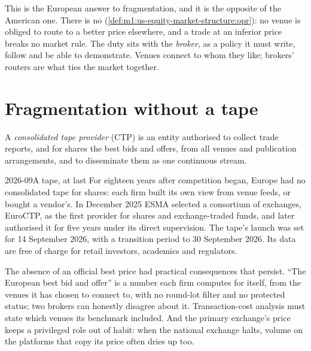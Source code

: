 This is the European answer to fragmentation, and it is the opposite of the
American one. There is no 
(\cref{def:m1:us-equity-market-structure:opr}): no venue is obliged to route
to a better price elsewhere, and a trade at an inferior price breaks no
market rule. The duty sits with the \emph{broker}, as a policy it must write,
follow and be able to demonstrate. Venues connect to whom they like; brokers'
routers are what ties the market together.

\section{Fragmentation without a tape}

\begin{definition}\label{def:m1:european-equity-market-structure:ctp}
A \emph{consolidated tape provider} (CTP)
is an entity authorised to collect trade reports, and for shares the best
bids and offers, from all venues and publication arrangements, and to
disseminate them as one continuous stream.
\end{definition}

\begin{dated}{2026-09}{A tape, at last}\label{dat:m1:european-equity-market-structure:ctp}
For eighteen years after competition began, Europe had no consolidated tape
for shares: each firm built its own view from venue feeds, or bought a
vendor's. In December 2025 ESMA selected a consortium of exchanges, EuroCTP,
as the first provider for shares and exchange-traded funds, and later
authorised it for five years under its direct supervision. The tape's launch
was set for 14 September 2026, with a transition period to 30 September
2026. Its data are free of charge for retail investors, academics and
regulators.
\end{dated}

The absence of an official best price had practical consequences that
persist. ``The European best bid and offer'' is a number each firm computes
for itself, from the venues it has chosen to connect to, with no round-lot
filter and no protected status; two brokers can honestly disagree about it.
Transaction-cost analysis must state which venues its benchmark included.
And the primary exchange's price keeps a privileged role out of habit: when
the national exchange halts, volume on the platforms that copy its price
often dries up too.

